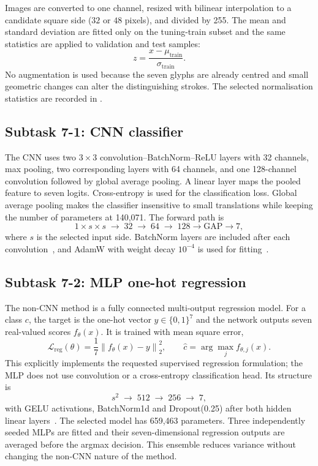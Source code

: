 Images are converted to one channel, resized with bilinear interpolation to a
candidate square side ($32$ or $48$ pixels), and divided by 255.  The mean and
standard deviation are fitted only on the tuning-train subset and the same
statistics are applied to validation and test samples:
\begin{equation}
  z = \frac{x-\mu_{\mathrm{train}}}{\sigma_{\mathrm{train}}}.
  \label{eq:task7-normalisation}
\end{equation}
No augmentation is used because the seven glyphs are already centred and
small geometric changes can alter the distinguishing strokes.  The selected
normalisation statistics are recorded in .

\subsection{Subtask 7-1: CNN classifier}

The CNN uses two $3\times3$ convolution--BatchNorm--ReLU layers with 32
channels, max pooling, two corresponding layers with 64 channels, and one
128-channel convolution followed by global average pooling.  A linear layer
maps the pooled feature to seven logits.  Cross-entropy is used for the
classification loss.  Global average pooling makes the classifier insensitive
to small translations while keeping the number of parameters at 140,071.
The forward path is
\[
  1\times s\times s\;\rightarrow\;32\;\rightarrow\;64\;\rightarrow\;128
  \rightarrow\mathrm{GAP}\rightarrow7,
\]
where $s$ is the selected input side.  BatchNorm layers are included after
each convolution~\cite{batchnorm}, and AdamW with weight decay $10^{-4}$
is used for fitting~\cite{adamw}.

\subsection{Subtask 7-2: MLP one-hot regression}

The non-CNN method is a fully connected multi-output regression model.  For a
class $c$, the target is the one-hot vector $y\in\{0,1\}^{7}$ and the network
outputs seven real-valued scores $f_\theta(x)$.  It is trained with mean
square error,
\begin{equation}
  \mathcal{L}_{\mathrm{reg}}(\theta)=
  \frac{1}{7}\left\|f_\theta(x)-y\right\|_2^2,
  \qquad \widehat c=\arg\max_j f_{\theta,j}(x).
  \label{eq:task7-regression}
\end{equation}
This explicitly implements the requested supervised regression formulation;
the MLP does not use convolution or a cross-entropy classification head.  Its
structure is
\[
  s^2\;\rightarrow\;512\;\rightarrow\;256\;\rightarrow\;7,
\]
with GELU activations, BatchNorm1d and Dropout(0.25) after both hidden linear
layers~\cite{batchnorm,dropout}.  The selected model has 659,463 parameters.  Three independently
seeded MLPs are fitted and their seven-dimensional regression outputs are
averaged before the argmax decision.  This ensemble reduces variance without
changing the non-CNN nature of the method.


